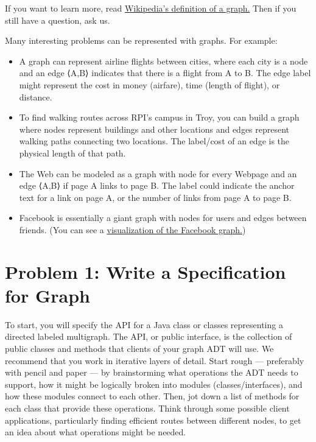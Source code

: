 \documentclass[11pt]{article}
\begin{document}
\noindent If you want to learn more, read \href{http://en.wikipedia.org/wiki/Graph_%28data_structure%29}{Wikipedia's definition of a graph.} Then if you still have a question, ask us.

\noindent Many interesting problems can be represented with graphs. For example:
\begin{itemize}

\item A graph can represent airline flights between cities, where each city is a node and an edge ⟨A,B⟩ indicates that there is a flight from A to B. The edge label might represent the cost in money (airfare), time (length of flight), or distance.
\item To find walking routes across RPI's campus in Troy, you can build a graph where nodes represent buildings and other locations and edges represent walking paths connecting two locations. The label/cost of an edge is the physical length of that path.
\item The Web can be modeled as a graph with node for every Webpage and an edge ⟨A,B⟩ if page A links to page B. The label could indicate the anchor text for a link on page A, or the number of links from page A to page B.
\item Facebook is essentially a giant graph with nodes for users and edges between friends. (You can see a \href{https://engineering.fb.com/2010/12/13/core-data/visualizing-friendships/}{visualization of the Facebook graph.})
\end{itemize}
\newpage

\section*{Problem 1: Write a Specification for Graph}
\label{sec:Problem 1}

\noindent To start, you will specify the API for a Java class or classes representing a directed labeled multigraph. The API, or public interface, is the collection of public classes and methods that clients of your graph ADT will use. We recommend that you work in iterative layers of detail. Start rough — preferably with pencil and paper — by brainstorming what operations the ADT needs to support, how it might be logically broken into modules (classes/interfaces), and how these modules connect to each other. Then, jot down a list of methods for each class that provide these operations. Think through some possible client applications, particularly finding efficient routes between different nodes, to get an idea about what operations might be needed.
\end{document}
